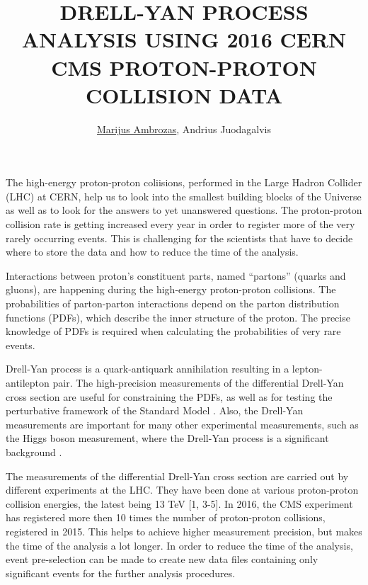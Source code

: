 \documentclass[a4paper,10pt,english]{article}
\begin{document}
\renewcommand{\figurename}{Fig.} 


\title{DRELL-YAN PROCESS ANALYSIS USING 2016 CERN CMS PROTON-PROTON COLLISION DATA}


\author{\uline{Marijus Ambrozas}, Andrius Juodagalvis}

\maketitle

\address{Institute of Theoretical Physics and Astronomy, Faculty of Physics, Vilnius University, Lithuania}


The high-energy proton-proton coliisions, performed in the Large Hadron Collider (LHC) at CERN, help us to
look into the smallest building blocks of the Universe as well as to look for the answers to yet unanswered
questions.
The proton-proton collision rate is getting increased every year in order to register more of the very
rarely occurring events.
This is challenging for the scientists that have to decide where to store the data and how to reduce the time of
the analysis.

Interactions between proton's constituent parts, named ``partons'' (quarks and gluons), are happening during the
high-energy proton-proton collisions.
The probabilities of parton-parton interactions depend on the parton distribution functions (PDFs), which describe
the inner structure of the proton.
The precise knowledge of PDFs is required when calculating the probabilities of very rare events.

Drell-Yan process is a quark-antiquark annihilation resulting in a lepton-antilepton pair.
The high-precision measurements of the differential Drell-Yan cross section are useful for constraining the PDFs, as
well as for testing the perturbative framework of the Standard Model \cite{DY13}.
Also, the Drell-Yan measurements are important for many other experimental measurements, such as the Higgs boson
measurement, where the Drell-Yan process is a significant background \cite{higgs}.

The measurements of the differential Drell-Yan cross section are carried out by different experiments at the LHC.
They have been done at various proton-proton collision energies, the latest being 13 TeV [1, 3-5].
In 2016, the CMS experiment has registered more then 10 times the number of proton-proton collisions, registered in
2015.
This helps to achieve higher measurement precision, but makes the time of the analysis a lot longer.
In order to reduce the time of the analysis, event pre-selection can be made to create new data files containing
only significant events for the further analysis procedures.
\end{document}
